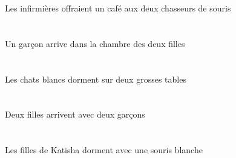 \begin{exe}
Les infirmières offraient un café aux deux chasseurs de souris
\ex\glll
\INDSgAbs{}   \garconDSgAbs{}    \DEFSgObl{}    \DEFDuObl{}   \filleCDuObl{}   \DE{}   \chambreBSgObl{}   \DANS{}  \arriverViPrsDSg{}\\
\INDSgAbsP{}   \garconDSgAbsP{}    \DEFSgOblP{}    \DEFDuOblP{}   \filleCDuOblP{}   \DEP{}   \chambreBSgOblP{}   \DANSP{}  \arriverViPrsDSgP{}\\
\INDSgAbsG{}   \garconDSgAbsG{}    \DEFSgOblG{}    \DEFDuOblG{}   \filleCDuOblG{}   \DEG{}   \chambreBSgOblG{}   \DANSG{}  \arriverViPrsDSgG{}\\
Un garçon arrive dans la chambre des deux filles
\ex\glll
\INDDuObl{}   \grosDDu{}   \tableDDuObl{}   \SUR{}   \DEFPlAbs{}   \blancDPl{}   \chatDPlAbs{}  \dormirViPrsDPl{}\\
\INDDuOblP{}   \grosDDuP{}   \tableDDuOblP{}   \SURP{}   \DEFPlAbsP{}   \blancDPlP{}   \chatDPlAbsP{}  \dormirViPrsDPlP{}\\
\INDDuOblG{}   \grosDDuG{}   \tableDDuOblG{}   \SURG{}   \DEFPlAbsG{}   \blancDPlG{}   \chatDPlAbsG{}  \dormirViPrsDPlG{}\\
Les chats blancs dorment sur deux grosses tables
\ex\glll
\INDDuObl{}   \garconDDuObl{}   \AVEC{}   \INDDuAbs{}   \filleCDuAbs{}  \arriverViPrsCDu{}\\
\INDDuOblP{}   \garconDDuOblP{}   \AVECP{}   \INDDuAbsP{}   \filleCDuAbsP{}  \arriverViPrsCDuP{}\\
\INDDuOblG{}   \garconDDuOblG{}   \AVECG{}   \INDDuAbsG{}   \filleCDuAbsG{}  \arriverViPrsCDuG{}\\
Deux filles arrivent avec deux garçons
\ex\glll
\DEFPlAbs{}    \INDSgObl{}   \KatishaASgObl{}   \DE{}   \filleCPlAbs{}    \INDSgObl{}   \blancBSg{}   \sourisBSgObl{}   \AVEC{}  \dormirViPrsCPl{}\\
\DEFPlAbsP{}    \INDSgOblP{}   \KatishaASgOblP{}   \DEP{}   \filleCPlAbsP{}    \INDSgOblP{}   \blancBSgP{}   \sourisBSgOblP{}   \AVECP{}  \dormirViPrsCPlP{}\\
\DEFPlAbsG{}    \INDSgOblG{}   \KatishaASgOblG{}   \DEG{}   \filleCPlAbsG{}    \INDSgOblG{}   \blancBSgG{}   \sourisBSgOblG{}   \AVECG{}  \dormirViPrsCPlG{}\\
Les filles de Katisha dorment avec une souris blanche
\ex\glll
\INDDuAbs{}   \jauneCDu{}   \coyoteCDuAbs{}    \DEFSgObl{}   \grandASg{}   \plaineASgObl{}   \DANS{}  \arriverViPstCDu{}\\
\INDDuAbsP{}   \jauneCDuP{}   \coyoteCDuAbsP{}    \DEFSgOblP{}   \grandASgP{}   \plaineASgOblP{}   \DANSP{}  \arriverViPstCDuP{}\\

\end{exe}
